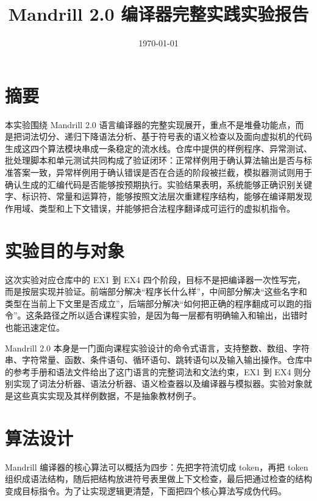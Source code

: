 \documentclass[UTF8,a4paper,12pt]{ctexart}
\title{Mandrill 2.0 编译器完整实践实验报告}
\author{}
\date{\today}
\begin{document}
\maketitle

\section*{摘要}
本实验围绕 Mandrill 2.0 语言编译器的完整实现展开，重点不是堆叠功能点，而是把词法切分、递归下降语法分析、基于符号表的语义检查以及面向虚拟机的代码生成这四个算法模块串成一条稳定的流水线。仓库中提供的样例程序、异常测试、批处理脚本和单元测试共同构成了验证闭环：正常样例用于确认算法输出是否与标准答案一致，异常样例用于确认错误是否在合适的阶段被拦截，模拟器测试则用于确认生成的汇编代码是否能够按预期执行。实验结果表明，系统能够正确识别关键字、标识符、常量和运算符，能够按照文法层次重建程序结构，能够在编译期发现作用域、类型和上下文错误，并能够把合法程序翻译成可运行的虚拟机指令。

\section{实验目的与对象}
这次实验对应仓库中的 EX1 到 EX4 四个阶段，目标不是把编译器一次性写完，而是按层实现并验证。前端部分解决“程序长什么样”，中间部分解决“这些名字和类型在当前上下文里是否成立”，后端部分解决“如何把正确的程序翻成可以跑的指令”。这条路径之所以适合课程实验，是因为每一层都有明确输入和输出，出错时也能迅速定位。

Mandrill 2.0 本身是一门面向课程实验设计的命令式语言，支持整数、数组、字符串、字符常量、函数、条件语句、循环语句、跳转语句以及输入输出操作。仓库中的参考手册和语法文件给出了这门语言的完整词法和文法约束，EX1 到 EX4 则分别实现了词法分析器、语法分析器、语义检查器以及编译器与模拟器。实验对象就是这些真实实现及其样例数据，不是抽象教材例子。

\section{算法设计}
Mandrill 编译器的核心算法可以概括为四步：先把字符流切成 token，再把 token 组织成语法结构，随后把结构放进符号表里做上下文检查，最后把通过检查的结构变成目标指令。为了让实现逻辑更清楚，下面把四个核心算法写成伪代码。
\end{document}
